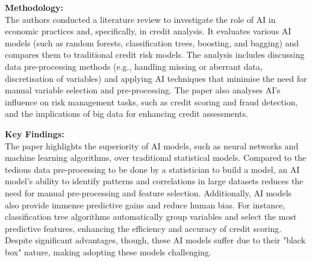 \documentclass[12pt,a4paper]{article}
\begin{document}
\begin{enumerate}
    \textbf{Methodology:}\\
    The authors conducted a literature review to investigate the role of AI in economic practices and, specifically, in credit analysis.  It evaluates various AI models (such as random forests, classification trees, boosting, and bagging) and compares them to traditional credit risk models. The analysis includes discussing data pre-processing methods (e.g., handling missing or aberrant data, discretisation of variables) and applying AI techniques that minimise the need for manual variable selection and pre-processing. The paper also analyses AI's influence on risk management tasks, such as credit scoring and fraud detection, and the implications of big data for enhancing credit assessments.
    
    \textbf{Key Findings:}\\
    The paper highlights the superiority of AI models, such as neural networks and machine learning algorithms, over traditional statistical models. Compared to the tedious data pre-processing to be done by a statistician to build a model, an AI model's ability to identify patterns and correlations in large datasets reduces the need for manual pre-processing and feature selection.  Additionally, AI models also provide immense predictive gains and reduce human bias.  For instance, classification tree algorithms automatically group variables and select the most predictive features, enhancing the efficiency and accuracy of credit scoring. Despite significant advantages, though, these AI models suffer due to their "black box" nature, making adopting these models challenging.    

\end{enumerate}

\end{document}
